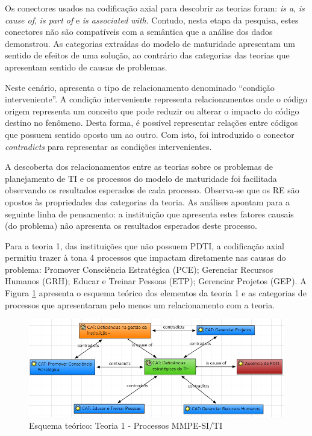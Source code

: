 Os conectores usados na codificação axial para descobrir as teorias foram: \textit{is a}, \textit{is cause of}, \textit{is part of} e \textit{is associated with}. Contudo, nesta etapa da pesquisa, estes conectores não são compatíveis com a semântica que a análise dos dados demonstrou. As categorias extraídas do modelo de maturidade apresentam um sentido de efeitos de uma solução, ao contrário das categorias das teorias que apresentam sentido de causas de problemas. 

Neste cenário,  apresenta o tipo de relacionamento denominado ``condição interveniente''. A condição interveniente representa relacionamentos onde o código origem representa um conceito que pode reduzir ou alterar o impacto do código destino no fenômeno. Desta forma, é possível representar relações entre códigos que possuem sentido oposto um ao outro. Com isto, foi introduzido o conector \textit{contradicts} para representar as condições intervenientes.

A descoberta dos relacionamentos entre as teorias sobre os problemas de planejamento de TI e os processos do modelo de maturidade foi facilitada observando os resultados esperados de cada processo. Observa-se que os RE são opostos às propriedades das categorias da teoria. As análises apontam para a seguinte linha de pensamento: a instituição que apresenta estes fatores causais (do problema) não apresenta os resultados esperados deste processo. 

Para a teoria 1, das instituições que não possuem PDTI, a codificação axial permitiu trazer à tona 4 processos que impactam diretamente nas causas do problema: Promover Consciência Estratégica (PCE); Gerenciar Recursos Humanos (GRH); Educar e Treinar Pessoas (ETP); Gerenciar Projetos (GEP). A Figura \ref{figura:teoria_processos_grupo1} apresenta o esquema teórico dos elementos da teoria 1 e as categorias de processos que apresentaram pelo menos um relacionamento com a teoria.

\begin{figure}[h!]
\centering %
\includegraphics[width=15cm]{figuras/teoria_processos_grupo1.PNG}
\caption{Esquema teórico: Teoria 1 - Processos MMPE-SI/TI}
\label{figura:teoria_processos_grupo1}
\end{figure}

